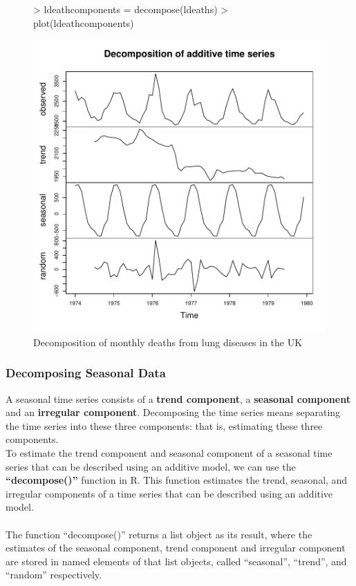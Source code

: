 \documentclass[10pt, a4paper]{article} %
\begin{document}
\begin{figure}[H]
\centering
\begin{Schunk}
\begin{Sinput}
> ldeathcomponents = decompose(ldeaths)
> plot(ldeathcomponents)
\end{Sinput}
\end{Schunk}
\includegraphics{FINAL_VERSION-Decomposition}
\caption{Decomposition of monthly deaths from lung diseases in the UK}
\end{figure}

\subsubsection{Decomposing Seasonal Data}%

A seasonal time series consists of a \textbf{trend component}, a \textbf{seasonal component} and an \textbf{irregular component}. Decomposing the time series means separating the time series into these three components: that is, estimating these three components.\\

\noindent To estimate the trend component and seasonal component of a seasonal time series that can be described using an additive model, we can use the \textbf{“decompose()”} function in R. This function estimates the trend, seasonal, and irregular components of a time series that can be described using an additive model.\\
\\
\noindent The function “decompose()” returns a list object as its result, where the estimates of the seasonal component, trend component and irregular component are stored in named elements of that list objects, called “seasonal”, “trend”, and “random” respectively.\\
\\
\end{document}

